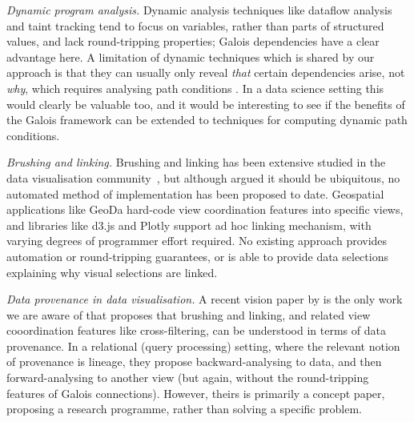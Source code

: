 \emph{Dynamic program analysis.} Dynamic analysis techniques like dataflow analysis \cite{chen88,reps95} and taint tracking \cite{reps95} tend to focus on variables, rather than parts of structured values, and lack round-tripping properties; Galois dependencies have a clear advantage here. A limitation of dynamic techniques which is shared by our approach is that they can usually only reveal \emph{that} certain dependencies arise, not \emph{why}, which requires analysing path conditions \cite{hammer06}. In a data science setting this would clearly be valuable too, and it would be interesting to see if the benefits of the Galois framework can be extended to techniques for computing dynamic path conditions.

\emph{Brushing and linking.} Brushing and linking has been extensive studied in the data visualisation community~\cite{mcdonald82,becker87}, but although \citet{roberts06} argued it should be ubiquitous, no automated method of implementation has been proposed to date. Geospatial applications like GeoDa \cite{anselin06} hard-code view coordination features into specific views, and libraries like d3.js and Plotly support ad hoc linking mechanism, with varying degrees of programmer effort required. No existing approach provides automation or round-tripping guarantees, or is able to provide data selections explaining why visual selections are linked.

\emph{Data provenance in data visualisation.} A recent vision paper by \citet{psallidas18} is the only work we are aware of that proposes that brushing and linking, and related view cooordination features like cross-filtering, can be understood in terms of data provenance. In a relational (query processing) setting, where the relevant notion of provenance is lineage, they propose backward-analysing to data, and then forward-analysing to another view (but again, without the round-tripping features of Galois connections). However, theirs is primarily a concept paper, proposing a research programme, rather than solving a specific problem.
